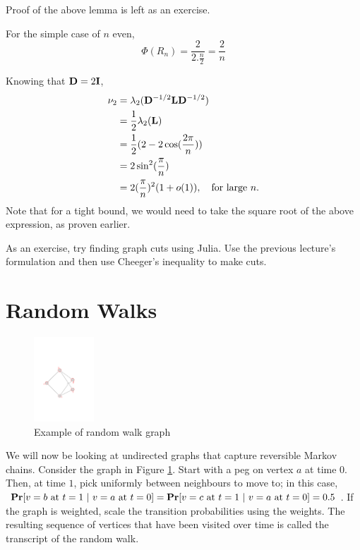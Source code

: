 \documentclass[11pt]{article}
\begin{document}
Proof of the above lemma is left as an exercise.

For the simple case of $n$ even,
\begin{equation*}
\Phi(R_n) = \dfrac{2}{2.\frac{n}{2}} = \dfrac{2}{n}
\end{equation*}

Knowing that $\V{D}=2\V{I}$,
\begin{align*}
\nu_2 &= \lambda_2(\V{D}^{-1/2}\V{L}\V{D}^{-1/2}) \\
&= \frac{1}{2}\lambda_2(\V{L}) \\
&= \frac{1}{2} (2-2\cos (\dfrac{2\pi}{n})) \\
&= 2 \sin^2(\dfrac{\pi}{n}) \\
&= 2 (\dfrac{\pi}{n})^2(1+o(1)), \quad \text{for large $n$}.
\end{align*}
Note that for a tight bound, we would need to take the square root of the above expression, as proven earlier. 

As an exercise, try finding graph cuts using Julia. Use the previous lecture's formulation and then use Cheeger's inequality to make cuts.

\newpage
\section{Random Walks}
\begin{figure}
\centering
\includegraphics[width=0.20\textwidth]{images/randomwalk}
\caption{Example of random walk graph}
\label{fig.randomwalk}
\end{figure}

We will now be looking at undirected graphs that capture reversible Markov chains. Consider the graph in Figure \ref{fig.randomwalk}. Start with a peg on vertex $a$ at time $0$. Then, at time $1$, pick uniformly between neighbours to move to; in this case, $\operatorname*{\bf Pr}[\text{$v=b$ at $t=1 \ |\ v=a$ at $t=0$}] = \operatorname*{\bf Pr}[\text{$v=c$ at $t=1 \ |\ v=a$ at $t=0$}] = 0.5$. If the graph is weighted, scale the transition probabilities using the weights. The resulting sequence of vertices that have been visited over time is called the transcript of the random walk.
\end{document}
